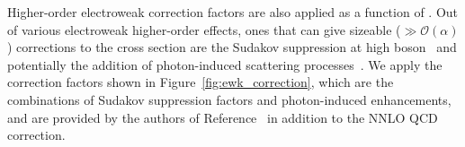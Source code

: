 Higher-order electroweak correction factors are also applied as a function of \ETg. 
Out of various electroweak higher-order effects, ones that can give sizeable ($\gg\mathcal{O}(\alpha)$) corrections to the cross section are the Sudakov suppression at high boson \pt\ and potentially the addition of photon-induced scattering processes~\cite{Denner:2014bna,Denner:2015fca}. 
We apply the correction factors shown in Figure~\ref{fig:ewk_correction}, which are the combinations of Sudakov suppression factors and photon-induced enhancements, and are provided by the authors of Reference~\cite{Denner:2015fca} in addition to the NNLO QCD correction.

\begin{figure}[htbp]
  \centering
\end{figure}
